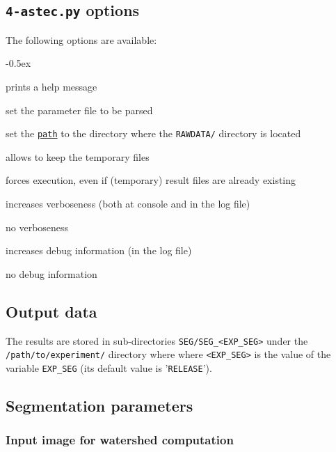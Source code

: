 \subsection{\texttt{4-astec.py} options}

The following options are available:
\begin{description}
  \itemsep -0.5ex
\item[\texttt{-h}] prints a help message
\item[\texttt{-p \underline{file}}] set the parameter file to be parsed
\item[\texttt{-e \underline{path}}] set the
  \texttt{\underline{path}} to the directory where the
  \texttt{RAWDATA/} directory is located
\item[\texttt{-k}] allows to keep the temporary files
\item[\texttt{-f}] forces execution, even if (temporary) result files
  are already existing
\item[\texttt{-v}] increases verboseness (both at console and in the
  log file)
\item[\texttt{-nv}] no verboseness
\item[\texttt{-d}]  increases debug information (in the
  log file)
\item[\texttt{-nd}] no debug information
\end{description}



\subsection{Output data}
\label{sec:cli:astec:output:data}

The results are stored in sub-directories
\texttt{SEG/SEG\_<EXP\_SEG>} under the
\texttt{/path/to/experiment/} directory where where \texttt{<EXP\_SEG>} is the value of the variable \texttt{EXP\_SEG} (its
default value is '\texttt{RELEASE}'). 


\subsection{Segmentation parameters}




\subsubsection{Input image for watershed computation}
\label{sec:cli:astec:input:watershed}

